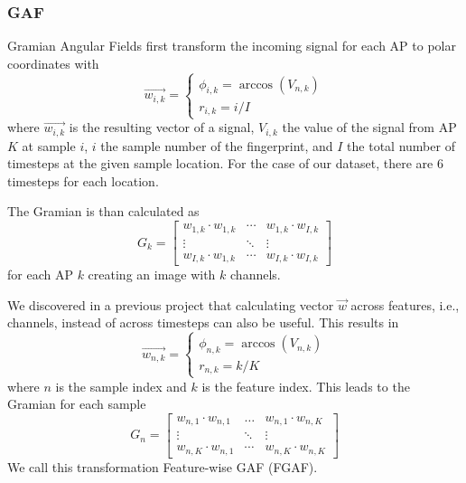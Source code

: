 \subsubsection{GAF}

Gramian Angular Fields \cite{wang2015imaging} first transform the incoming signal for each AP to polar coordinates with
\begin{equation}
	\vec{w_{i, k}} = \begin{cases}
		\phi_{i, k} = \arccos(V_{n, k}) \\
		r_{i, k} = i / I
	\end{cases}
\end{equation}
where $\vec{w_{i, k}}$ is the resulting vector of a signal, $V_{i, k}$ the value of the signal from AP $K$ at sample $i$, $i$ the sample number of the fingerprint, and $I$ the total number of timesteps at the given sample location.
For the case of our dataset, there are 6 timesteps for each location.

The Gramian is than calculated as
\begin{equation}
	G_k = \begin{bmatrix}
		w_{1,k} \cdot w_{1,k} & \cdots & w_{1,k} \cdot w_{I,k} \\
		\vdots                & \ddots & \vdots \\
		w_{I,k} \cdot w_{1,k} & \cdots & w_{I,k} \cdot w_{I,k}
	\end{bmatrix}
\end{equation}
for each AP $k$ creating an image with $k$ channels.

We discovered in a previous project that calculating vector $\vec{w}$ across features, i.e., channels, instead of across timesteps can also be useful. 
This results in
\begin{equation}
	\vec{w_{n, k}} = \begin{cases}
		\phi_{n, k} = \arccos(V_{n, k}) \\
		r_{n, k} = k / K
	\end{cases}
\end{equation}
where $n$ is the sample index and $k$ is the feature index. This leads to the Gramian for each sample 
\begin{equation}
	G_n = \begin{bmatrix}
		w_{n, 1} \cdot w_{n, 1} & \ldots & w_{n, 1} \cdot w_{n, K} \\
		\vdots                  & \ddots & \vdots \\
		w_{n, K} \cdot w_{n, 1} & \cdots & w_{n, K} \cdot w_{n, K}
	\end{bmatrix}
\end{equation}
We call this transformation Feature-wise GAF (FGAF).


